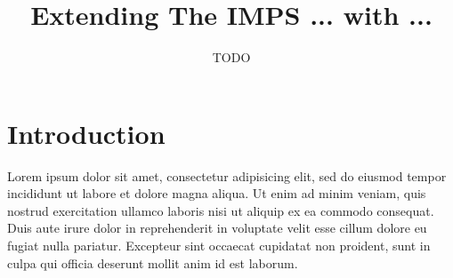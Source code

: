 \documentclass[11pt]{article}
\begin{document}
\title{Extending The IMPS ... with ... }
\author{TODO}

\maketitle

\section{Introduction}

Lorem ipsum dolor sit amet, consectetur adipisicing elit, sed do eiusmod tempor
incididunt ut labore et dolore magna aliqua. Ut enim ad minim veniam, quis
nostrud exercitation ullamco laboris nisi ut aliquip ex ea commodo consequat.
Duis aute irure dolor in reprehenderit in voluptate velit esse cillum dolore eu
fugiat nulla pariatur. Excepteur sint occaecat cupidatat non proident, sunt in
culpa qui officia deserunt mollit anim id est laborum.
\end{document}
